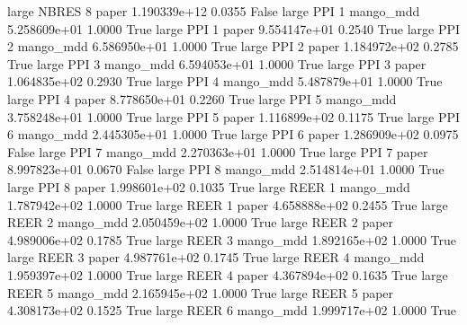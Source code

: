      large    NBRES                 8                 paper 1.190339e+12      0.0355   False
     large      PPI                 1             mango_mdd 5.258609e+01      1.0000    True
     large      PPI                 1                 paper 9.554147e+01      0.2540    True
     large      PPI                 2             mango_mdd 6.586950e+01      1.0000    True
     large      PPI                 2                 paper 1.184972e+02      0.2785    True
     large      PPI                 3             mango_mdd 6.594053e+01      1.0000    True
     large      PPI                 3                 paper 1.064835e+02      0.2930    True
     large      PPI                 4             mango_mdd 5.487879e+01      1.0000    True
     large      PPI                 4                 paper 8.778650e+01      0.2260    True
     large      PPI                 5             mango_mdd 3.758248e+01      1.0000    True
     large      PPI                 5                 paper 1.116899e+02      0.1175    True
     large      PPI                 6             mango_mdd 2.445305e+01      1.0000    True
     large      PPI                 6                 paper 1.286909e+02      0.0975   False
     large      PPI                 7             mango_mdd 2.270363e+01      1.0000    True
     large      PPI                 7                 paper 8.997823e+01      0.0670   False
     large      PPI                 8             mango_mdd 2.514814e+01      1.0000    True
     large      PPI                 8                 paper 1.998601e+02      0.1035    True
     large     REER                 1             mango_mdd 1.787942e+02      1.0000    True
     large     REER                 1                 paper 4.658888e+02      0.2455    True
     large     REER                 2             mango_mdd 2.050459e+02      1.0000    True
     large     REER                 2                 paper 4.989006e+02      0.1785    True
     large     REER                 3             mango_mdd 1.892165e+02      1.0000    True
     large     REER                 3                 paper 4.987761e+02      0.1745    True
     large     REER                 4             mango_mdd 1.959397e+02      1.0000    True
     large     REER                 4                 paper 4.367894e+02      0.1635    True
     large     REER                 5             mango_mdd 2.165945e+02      1.0000    True
     large     REER                 5                 paper 4.308173e+02      0.1525    True
     large     REER                 6             mango_mdd 1.999717e+02      1.0000    True

